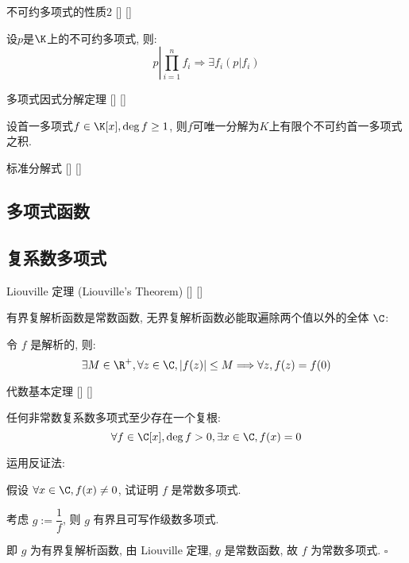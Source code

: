 \documentclass[UTF8]{ctexart}
\begin{document}
		\begin{ppt}
			[]
			{不可约多项式的性质2}
			[]
			[]

			设$p$是$\K$上的不可约多项式, 则: 
			\[p\left|\prod_{i=1}^n\right. f_i\Longrightarrow\exists f_i(p|f_i)\]
		\end{ppt}
		
		\begin{thm}
			[]
			{多项式因式分解定理}
			[]
			[]

			设首一多项式$f\in\K[x], \deg f\geq 1$, 则$f$可唯一分解为$K$上有限个不可约首一多项式之积. 
		\end{thm}
		
		\begin{dfn}
			[]
			{标准分解式}
			[]
			[]


		\end{dfn}

	\subsection{多项式函数}
	
	\subsection{复系数多项式}

		\begin{thm}
			[]
			{Liouville 定理 (Liouville's Theorem)}
			[]
			[]

			有界复解析函数是常数函数, 无界复解析函数必能取遍除两个值以外的全体 \(\C\): 

			令 \(f\) 是解析的, 则: 
			\[\exists M\in\R^+, \forall z\in\C, |f(z)|\leq M\Longrightarrow\forall z, f(z)=f(0)\]
		\end{thm}
	
		\begin{thm}
			[]
			{代数基本定理}
			[]
			[]

			任何非常数复系数多项式至少存在一个复根: 
			\[\forall f\in\C[x], \deg f>0, \exists x\in\C, f(x)=0\]
		\end{thm}

		\begin{prf}
			运用反证法: 

			假设 \(\forall x\in\C, f(x)\neq 0\), 试证明 \(f\) 是常数多项式. 

			考虑 \(g:=\dfrac{1}{f}\), 则 \(g\) 有界且可写作级数多项式. 

			即 \(g\) 为有界复解析函数, 由 Liouville 定理, \(g\) 是常数函数, 故 \(f\) 为常数多项式. \(\square\)
		\end{prf}
	
\end{document}
